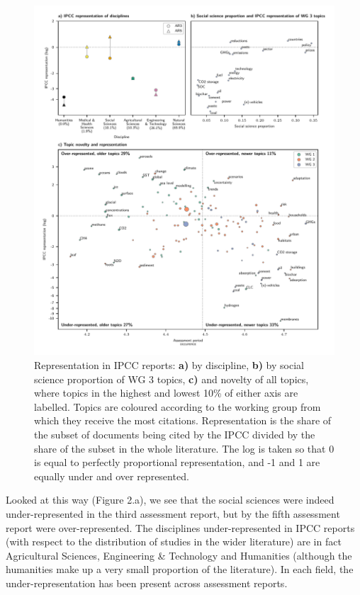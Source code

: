 \documentclass{article}
\begin{document}
\begin{linenumbers}
\begin{figure}[htp]
	\begin{center}
		\includegraphics[width=180mm]{plots_pub/big_panel_representation.pdf}
		\caption{Representation in IPCC reports: \textbf{a)} by discipline, \textbf{b)} by social science proportion of WG 3 topics, \textbf{c)} and novelty of all topics, where topics in the highest and lowest 10\% of either axis are labelled. Topics are coloured according to the working group from which they receive the most citations. Representation is the share of the subset of documents being cited by the IPCC divided by the share of the subset in the whole literature. The log is taken so that 0 is equal to perfectly proportional representation, and -1 and 1 are equally under and over represented.}
		\label{oecd_rep}
	\end{center}
\end{figure}


Looked at this way (Figure 2.a), we see that the social sciences were indeed under-represented in the third assessment report, but by the fifth assessment report were over-represented. The disciplines under-represented in IPCC reports (with respect to the distribution of studies in the wider literature) are in fact Agricultural Sciences, Engineering \& Technology and Humanities (although the humanities make up a very small proportion of the literature). In each field, the under-representation has been present across assessment reports.



\end{linenumbers}
\end{document}
